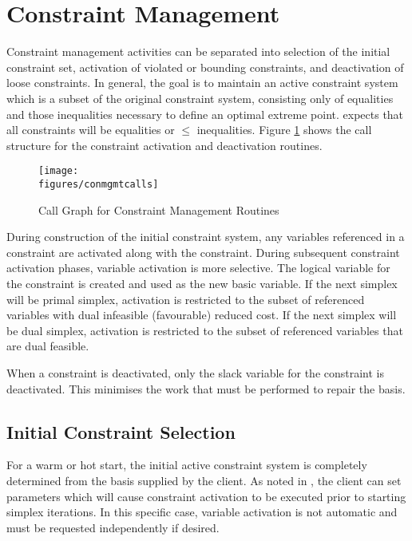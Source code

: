 \section{Constraint Management}
\label{sec:ConstraintManagement}

Constraint management activities can be separated into selection of the initial
constraint set, activation of violated or bounding constraints, and
deactivation of loose constraints.
In general, the goal is to maintain an active constraint system which is
a subset of the original constraint system, consisting only of
equalities and those inequalities necessary to define an optimal extreme point.
\dylp expects that all constraints will be equalities or $\leq$
inequalities.
Figure \ref{fig:ConmgmtCalls} shows the call structure for the constraint
activation and deactivation routines.
\begin{figure}[htbp]
\centering
\texttt{[image: \\figures/conmgmtcalls]}
\caption{Call Graph for Constraint Management Routines}\label{fig:ConmgmtCalls}
\end{figure}

During construction of the initial constraint system, any variables referenced
in a constraint are activated along with the constraint.
During subsequent constraint activation phases, variable activation is more
selective.
The logical variable for the constraint is created and used as the new basic
variable.
If the next simplex will be primal simplex, activation is restricted to
the subset of referenced variables with dual infeasible (favourable)
reduced cost.
If the next simplex will be dual simplex, activation is restricted to
the subset of referenced variables that are dual feasible.

When a constraint is deactivated, only the slack variable for the constraint
is deactivated.
This minimises the work that must be performed to repair the basis.

\subsection{Initial Constraint Selection}
\label{InitialConSelect}

For a warm or hot start, the initial active constraint system is completely
determined from the basis supplied by the client.
As noted in , the client can
set parameters which will cause constraint activation to be executed prior
to starting simplex iterations.
In this specific case, variable activation is not automatic and must be
requested independently if desired.

